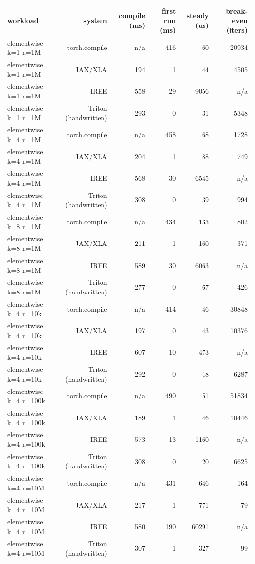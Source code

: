 \begin{tabular}{lrrrrr}
\toprule
workload & system & compile (ms) & first run (ms) & steady (us) & break-even (iters) \\
\midrule
elementwise k=1 n=1M & torch.compile & n/a & 416 & 60 & 20934 \\
elementwise k=1 n=1M & JAX/XLA & 194 & 1 & 44 & 4505 \\
elementwise k=1 n=1M & IREE & 558 & 29 & 9056 & n/a \\
elementwise k=1 n=1M & Triton (handwritten) & 293 & 0 & 31 & 5348 \\
elementwise k=4 n=1M & torch.compile & n/a & 458 & 68 & 1728 \\
elementwise k=4 n=1M & JAX/XLA & 204 & 1 & 88 & 749 \\
elementwise k=4 n=1M & IREE & 568 & 30 & 6545 & n/a \\
elementwise k=4 n=1M & Triton (handwritten) & 308 & 0 & 39 & 994 \\
elementwise k=8 n=1M & torch.compile & n/a & 434 & 133 & 802 \\
elementwise k=8 n=1M & JAX/XLA & 211 & 1 & 160 & 371 \\
elementwise k=8 n=1M & IREE & 589 & 30 & 6063 & n/a \\
elementwise k=8 n=1M & Triton (handwritten) & 277 & 0 & 67 & 426 \\
elementwise k=4 n=10k & torch.compile & n/a & 414 & 46 & 30848 \\
elementwise k=4 n=10k & JAX/XLA & 197 & 0 & 43 & 10376 \\
elementwise k=4 n=10k & IREE & 607 & 10 & 473 & n/a \\
elementwise k=4 n=10k & Triton (handwritten) & 292 & 0 & 18 & 6287 \\
elementwise k=4 n=100k & torch.compile & n/a & 490 & 51 & 51834 \\
elementwise k=4 n=100k & JAX/XLA & 189 & 1 & 46 & 10446 \\
elementwise k=4 n=100k & IREE & 573 & 13 & 1160 & n/a \\
elementwise k=4 n=100k & Triton (handwritten) & 308 & 0 & 20 & 6625 \\
elementwise k=4 n=10M & torch.compile & n/a & 431 & 646 & 164 \\
elementwise k=4 n=10M & JAX/XLA & 217 & 1 & 771 & 79 \\
elementwise k=4 n=10M & IREE & 580 & 190 & 60291 & n/a \\
elementwise k=4 n=10M & Triton (handwritten) & 307 & 1 & 327 & 99 \\

\end{tabular}
